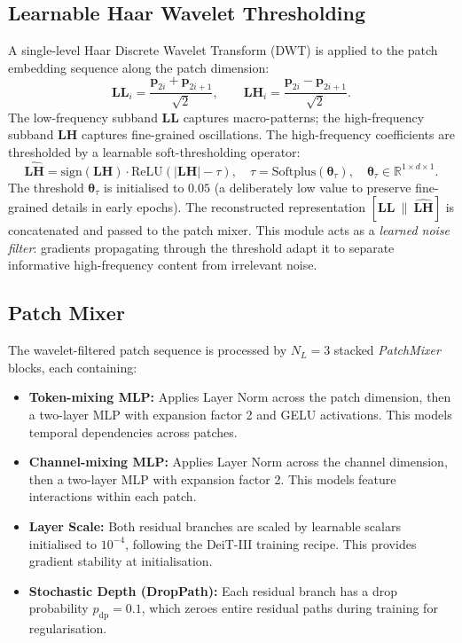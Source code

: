 \documentclass[11pt, letterpaper]{article}
\begin{document}
\subsection{Learnable Haar Wavelet Thresholding}
\label{sec:wavelet}

A single-level Haar Discrete Wavelet Transform (DWT) is applied to the patch embedding sequence along the patch dimension:
\[
  \mathbf{LL}_i = \frac{\mathbf{p}_{2i} + \mathbf{p}_{2i+1}}{\sqrt{2}}, \qquad
  \mathbf{LH}_i = \frac{\mathbf{p}_{2i} - \mathbf{p}_{2i+1}}{\sqrt{2}}.
\]
The low-frequency subband $\mathbf{LL}$ captures macro-patterns; the high-frequency subband $\mathbf{LH}$ captures fine-grained oscillations. The high-frequency coefficients are thresholded by a learnable soft-thresholding operator:
\[
  \widehat{\mathbf{LH}} = \text{sign}(\mathbf{LH}) \cdot \text{ReLU}\!\left(|\mathbf{LH}| - \tau\right),
  \quad \tau = \text{Softplus}(\boldsymbol{\theta}_\tau),\quad \boldsymbol{\theta}_\tau \in \mathbb{R}^{1 \times d \times 1}.
\]
The threshold $\boldsymbol{\theta}_\tau$ is initialised to $0.05$ (a deliberately low value to preserve fine-grained details in early epochs). The reconstructed representation $[\mathbf{LL}\ \|\  \widehat{\mathbf{LH}}]$ is concatenated and passed to the patch mixer. This module acts as a \textit{learned noise filter}: gradients propagating through the threshold adapt it to separate informative high-frequency content from irrelevant noise.

\subsection{Patch Mixer}
\label{sec:mixer}

The wavelet-filtered patch sequence is processed by $N_L = 3$ stacked \textit{PatchMixer} blocks, each containing:

\begin{itemize}
  \item \textbf{Token-mixing MLP:} Applies Layer Norm across the patch dimension, then a two-layer MLP with expansion factor 2 and GELU activations. This models temporal dependencies across patches.
  \item \textbf{Channel-mixing MLP:} Applies Layer Norm across the channel dimension, then a two-layer MLP with expansion factor 2. This models feature interactions within each patch.
  \item \textbf{Layer Scale:} Both residual branches are scaled by learnable scalars initialised to $10^{-4}$, following the DeiT-III training recipe. This provides gradient stability at initialisation.
  \item \textbf{Stochastic Depth (DropPath):} Each residual branch has a drop probability $p_\text{dp} = 0.1$, which zeroes entire residual paths during training for regularisation.
\end{itemize}
\end{document}

